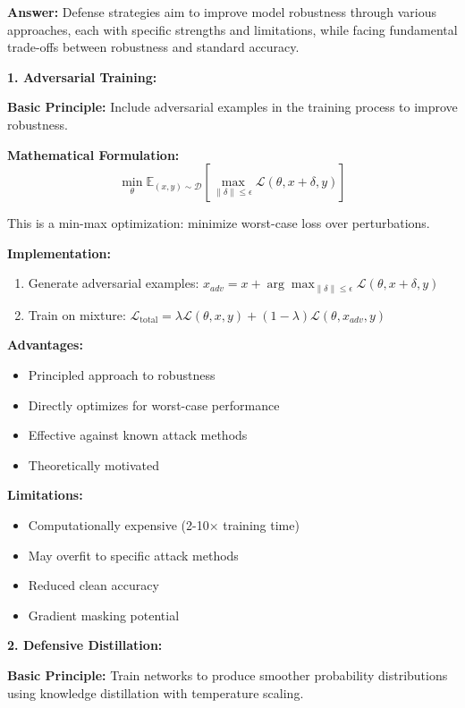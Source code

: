 \documentclass[12pt]{article}
\newcommand{\answer}[1]{{\color{answercolor}\textbf{Answer:} #1}}
\newcommand{\explanation}[1]{{\color{explanationcolor}#1}}
\begin{document}
\begin{enumerate}[(a)]
    \answer{Defense strategies aim to improve model robustness through various approaches, each with specific strengths and limitations, while facing fundamental trade-offs between robustness and standard accuracy.}
    
    \explanation{
    \textbf{1. Adversarial Training:}
    
    \textbf{Basic Principle:}
    Include adversarial examples in the training process to improve robustness.
    
    \textbf{Mathematical Formulation:}
    $$\min_\theta \mathbb{E}_{(x,y) \sim \mathcal{D}}\left[\max_{\|\delta\| \leq \epsilon} \mathcal{L}(\theta, x + \delta, y)\right]$$
    
    This is a min-max optimization: minimize worst-case loss over perturbations.
    
    \textbf{Implementation:}
    \begin{enumerate}
        \item Generate adversarial examples: $x_{adv} = x + \arg\max_{\|\delta\| \leq \epsilon} \mathcal{L}(\theta, x + \delta, y)$
        \item Train on mixture: $\mathcal{L}_{\text{total}} = \lambda \mathcal{L}(\theta, x, y) + (1-\lambda) \mathcal{L}(\theta, x_{adv}, y)$
    \end{enumerate}
    
    \textbf{Advantages:}
    \begin{itemize}
        \item Principled approach to robustness
        \item Directly optimizes for worst-case performance
        \item Effective against known attack methods
        \item Theoretically motivated
    \end{itemize}
    
    \textbf{Limitations:}
    \begin{itemize}
        \item Computationally expensive (2-10× training time)
        \item May overfit to specific attack methods
        \item Reduced clean accuracy
        \item Gradient masking potential
    \end{itemize}
    
    \textbf{2. Defensive Distillation:}
    
    \textbf{Basic Principle:}
    Train networks to produce smoother probability distributions using knowledge distillation with temperature scaling.
    
}
\end{enumerate}
\end{document}
